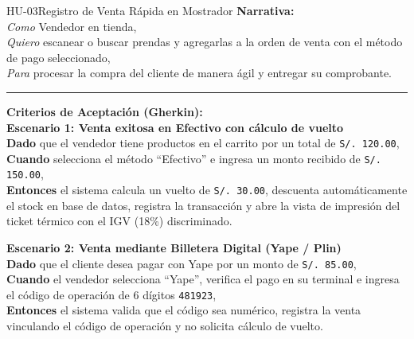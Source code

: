 \begin{hubox}{HU-03}{Registro de Venta Rápida en Mostrador}
\textbf{Narrativa:}\\
\textit{Como} Vendedor en tienda,\\
\textit{Quiero} escanear o buscar prendas y agregarlas a la orden de venta con el método de pago seleccionado,\\
\textit{Para} procesar la compra del cliente de manera ágil y entregar su comprobante.

\vspace{0.25cm}\hrule\vspace{0.25cm}
\textbf{Criterios de Aceptación (Gherkin):}\\
\textbf{Escenario 1: Venta exitosa en Efectivo con cálculo de vuelto}\\
\textbf{Dado} que el vendedor tiene productos en el carrito por un total de \texttt{S/. 120.00},\\
\textbf{Cuando} selecciona el método ``Efectivo'' e ingresa un monto recibido de \texttt{S/. 150.00},\\
\textbf{Entonces} el sistema calcula un vuelto de \texttt{S/. 30.00}, descuenta automáticamente el stock en base de datos, registra la transacción y abre la vista de impresión del ticket térmico con el IGV (18\%) discriminado.

\vspace{0.2cm}
\textbf{Escenario 2: Venta mediante Billetera Digital (Yape / Plin)}\\
\textbf{Dado} que el cliente desea pagar con Yape por un monto de \texttt{S/. 85.00},\\
\textbf{Cuando} el vendedor selecciona ``Yape'', verifica el pago en su terminal e ingresa el código de operación de 6 dígitos \texttt{481923},\\
\textbf{Entonces} el sistema valida que el código sea numérico, registra la venta vinculando el código de operación y no solicita cálculo de vuelto.
\end{hubox}

